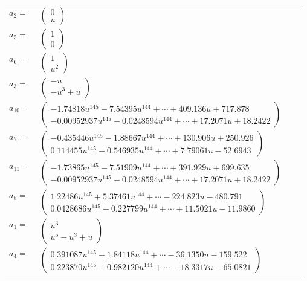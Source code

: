 \documentclass[1p]{elsarticle_modified}
\theoremstyle{definition}
\begin{document}
\begin{tabular}{m{7pt} m{180pt} m{7pt} m{180pt} }
\flushright $a_{2}=$&$\begin{pmatrix}0\\u\end{pmatrix}$ \\
\flushright $a_{5}=$&$\begin{pmatrix}1\\0\end{pmatrix}$ \\
\flushright $a_{6}=$&$\begin{pmatrix}1\\u^2\end{pmatrix}$ \\
\flushright $a_{3}=$&$\begin{pmatrix}- u\\- u^3+u\end{pmatrix}$ \\
\flushright $a_{10}=$&$\begin{pmatrix}-1.74818 u^{145}-7.54395 u^{144}+\cdots+409.136 u+717.878\\-0.00952937 u^{145}-0.0248594 u^{144}+\cdots+17.2071 u+18.2422\end{pmatrix}$ \\
\flushright $a_{7}=$&$\begin{pmatrix}-0.435446 u^{145}-1.88667 u^{144}+\cdots+130.906 u+250.926\\0.114455 u^{145}+0.546935 u^{144}+\cdots+7.79061 u-52.6943\end{pmatrix}$ \\
\flushright $a_{11}=$&$\begin{pmatrix}-1.73865 u^{145}-7.51909 u^{144}+\cdots+391.929 u+699.635\\-0.00952937 u^{145}-0.0248594 u^{144}+\cdots+17.2071 u+18.2422\end{pmatrix}$ \\
\flushright $a_{8}=$&$\begin{pmatrix}1.22486 u^{145}+5.37461 u^{144}+\cdots-224.823 u-480.791\\0.0428686 u^{145}+0.227799 u^{144}+\cdots+11.5021 u-11.9860\end{pmatrix}$ \\
\flushright $a_{1}=$&$\begin{pmatrix}u^3\\u^5- u^3+u\end{pmatrix}$ \\
\flushright $a_{4}=$&$\begin{pmatrix}0.391087 u^{145}+1.84118 u^{144}+\cdots-36.1350 u-159.522\\0.223870 u^{145}+0.982120 u^{144}+\cdots-18.3317 u-65.0821\end{pmatrix}$ \\

\end{tabular}
\end{document}
